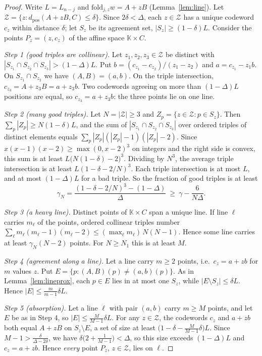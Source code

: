 \documentclass[11pt]{article}
\theoremstyle{definition}
\newcommand{\K}{\mathbb{K}}
\newcommand{\fold}{\mathrm{fold}}
\newcommand{\dpos}{d_{\mathrm{pos}}}
\begin{document}
\begin{proof}
Write $L=L_{n-j}$ and $\fold_{j,z}w=A+zB$ (Lemma~\ref{lem:line}). Let
$\mathcal{Z}=\{z:\dpos(A+zB,C)\le\delta\}$. Since $2\delta<\Delta$, each $z\in\mathcal{Z}$ has a unique
codeword $c_z$ within distance $\delta$; let $S_z$ be its agreement set, $|S_z|\ge(1-\delta)L$.
Consider the points $P_z=(z,c_z)$ of the affine space $\K\times C$.

\emph{Step 1 (good triples are collinear).} Let $z_1,z_2,z_3\in\mathcal{Z}$ be distinct with
$|S_{z_1}\cap S_{z_2}\cap S_{z_3}|>(1-\Delta)L$. Put $b=(c_{z_1}-c_{z_2})/(z_1-z_2)$ and
$a=c_{z_1}-z_1b$. On $S_{z_1}\cap S_{z_2}$ we have $(A,B)=(a,b)$. On the triple intersection,
$c_{z_3}=A+z_3B=a+z_3b$. Two codewords agreeing on more than $(1-\Delta)L$ positions are equal, so
$c_{z_3}=a+z_3b$: the three points lie on one line.

\emph{Step 2 (many good triples).} Let $N=|\mathcal{Z}|\ge3$ and
$Z_p=\{z\in\mathcal{Z}:p\in S_z\}$. Then $\sum_p|Z_p|\ge N(1-\delta)L$, and the sum of
$|S_{z_1}\cap S_{z_2}\cap S_{z_3}|$ over ordered triples of distinct elements equals
$\sum_p|Z_p|(|Z_p|-1)(|Z_p|-2)$. Since $x(x-1)(x-2)\ge\max(0,x-2)^3$ on integers and the right side
is convex, this sum is at least $L\bigl(N(1-\delta)-2\bigr)^3$. Dividing by $N^3$, the average
triple intersection is at least $L(1-\delta-2/N)^3$. Each triple intersection is at most $L$, and
at most $(1-\Delta)L$ for a bad triple. So the fraction of good triples is at least
\[
\gamma_N=\frac{(1-\delta-2/N)^3-(1-\Delta)}{\Delta}\ \ge\ \gamma-\frac{6}{N\Delta}.
\]

\emph{Step 3 (a heavy line).} Distinct points of $\K\times C$ span a unique line. If line $\ell$
carries $m_\ell$ of the points, ordered collinear triples number
$\sum_\ell m_\ell(m_\ell-1)(m_\ell-2)\le(\max_\ell m_\ell)\,N(N-1)$. Hence some line carries at
least $\gamma_N(N-2)$ points. For $N\ge N_1$ this is at least $M$.

\emph{Step 4 (agreement along a line).} Let a line carry $m\ge2$ points, i.e.\ $c_z=a+zb$ for
$m$ values $z$. Put $E=\{p:(A,B)(p)\neq(a,b)(p)\}$. As in Lemma~\ref{lem:lineprox}, each $p\in E$
lies in at most one $S_z$, while $|E\setminus S_z|\le\delta L$. Hence $|E|\le\frac{m}{m-1}\delta L$.

\emph{Step 5 (absorption).} Let a line $\ell$ with pair $(a,b)$ carry $m\ge M$ points, and let $E$ be as in Step 4, so $|E|\le\frac{M}{M-1}\delta L$. For any $z\in\mathcal{Z}$, the codewords $c_z$ and $a+zb$ both equal $A+zB$ on $S_z\setminus E$, a set of size at least $\bigl(1-\delta-\frac{M}{M-1}\delta\bigr)L$. Since $M-1>\frac{\delta}{\Delta-2\delta}$, we have $\delta\bigl(2+\frac{1}{M-1}\bigr)<\Delta$, so this size exceeds $(1-\Delta)L$ and $c_z=a+zb$. Hence \emph{every} point $P_z$, $z\in\mathcal{Z}$, lies on $\ell$.


\end{proof}
\end{document}
